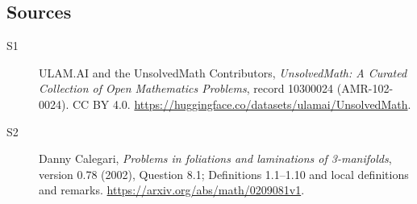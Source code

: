 \documentclass[11pt]{article}
\begin{document}
\subsection{Sources}
\begin{description}
\item[\hypertarget{source:10300024:1}{S1}] ULAM.AI and the UnsolvedMath Contributors, \emph{UnsolvedMath: A Curated Collection of Open Mathematics Problems}, record 10300024 (AMR-102-0024). CC BY 4.0. \url{https://huggingface.co/datasets/ulamai/UnsolvedMath}.
\item[\hypertarget{source:10300024:2}{S2}] Danny Calegari, \emph{Problems in foliations and laminations of 3-manifolds}, version 0.78 (2002), Question 8.1; Definitions 1.1--1.10 and local definitions and remarks. \url{https://arxiv.org/abs/math/0209081v1}.
\end{description}
\label{end:10300024}
\end{document}
